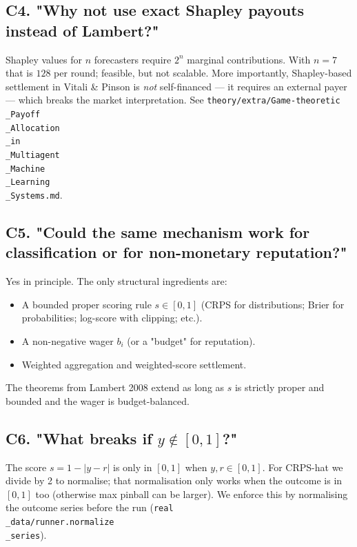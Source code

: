 \documentclass[11pt]{article}
\begin{document}
\subsection{C4. "Why not use exact Shapley payouts instead of Lambert?"}


Shapley values for $n$ forecasters require $2^n$ marginal contributions. With $n = 7$ that is $128$ per round; feasible, but not scalable. More importantly, Shapley-based settlement in Vitali \& Pinson is \emph{not} self-financed --- it requires an external payer --- which breaks the market interpretation. See \texttt{theory/extra/Game-theoretic\\_Payoff\\_Allocation\\_in\\_Multiagent\\_Machine\\_Learning\\_Systems.md}.

\subsection{C5. "Could the same mechanism work for classification or for non-monetary reputation?"}


Yes in principle. The only structural ingredients are:

\begin{itemize}
\item A bounded proper scoring rule $s \in [0,1]$ (CRPS for distributions; Brier for probabilities; log-score with clipping; etc.).
\item A non-negative wager $b_i$ (or a "budget" for reputation).
\item Weighted aggregation and weighted-score settlement.
\end{itemize}

The theorems from Lambert 2008 extend as long as $s$ is strictly proper and bounded and the wager is budget-balanced.

\subsection{C6. "What breaks if $y \notin [0,1]$?"}


The score $s = 1 - |y - r|$ is only in $[0,1]$ when $y, r \in [0,1]$. For CRPS-hat we divide by 2 to normalise; that normalisation only works when the outcome is in $[0,1]$ too (otherwise max pinball can be larger). We enforce this by normalising the outcome series before the run (\texttt{real\\_data/runner.normalize\\_series}).
\end{document}
